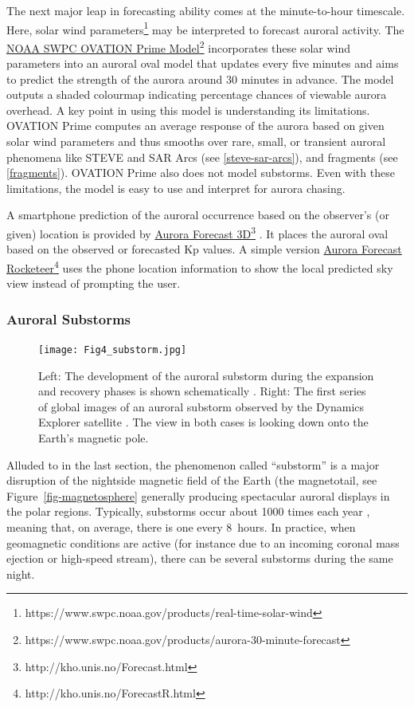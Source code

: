 \documentclass{article}
\renewcommand{\cite}[1]{\parencite{#1}}
\begin{document}
The next major leap in forecasting ability comes at the minute-to-hour timescale. Here, solar wind parameters\footnote{https://www.swpc.noaa.gov/products/real-time-solar-wind} may be interpreted to forecast auroral activity. The \href{https://www.swpc.noaa.gov/products/aurora-30-minute-forecast}{NOAA SWPC OVATION Prime Model}\footnote{https://www.swpc.noaa.gov/products/aurora-30-minute-forecast} \cite{Newell2014} incorporates these solar wind parameters into an auroral oval model that updates every five minutes and aims to predict the strength of the aurora around 30 minutes in advance. The model outputs a shaded colourmap indicating percentage chances of viewable aurora overhead. A key point in using this model is understanding its limitations. OVATION Prime computes an average response of the aurora based on given solar wind parameters and thus smooths over rare, small, or transient auroral phenomena like STEVE and SAR Arcs (see \ref{steve-sar-arcs}), and fragments (see \ref{fragments}). OVATION Prime also does not model substorms. Even with these limitations, the model is easy to use and interpret for aurora chasing.

A smartphone prediction of the auroral occurrence based on the observer's (or given) location is provided by \href{http://kho.unis.no/Forecast.html}{Aurora Forecast 3D}\footnote{http://kho.unis.no/Forecast.html} \cite{Sigernes2011}. It places the auroral oval based on the observed or forecasted Kp values. A simple version \href{http://kho.unis.no/ForecastR.html}{Aurora Forecast Rocketeer}\footnote{http://kho.unis.no/ForecastR.html} uses the phone location information to show the local predicted sky view instead of prompting the user.

\subsubsection{Auroral Substorms}
\label{auroral-substorms}

\begin{figure}
  \texttt{[image: Fig4\_substorm.jpg]}
  \caption{Left: The development of the auroral substorm during the expansion and recovery phases is shown schematically \cite{Akasofu1964}. Right: The first series of global images of an auroral substorm observed by the Dynamics Explorer satellite \cite{frank1988}. The view in both cases is looking down onto the Earth's magnetic pole.} 
  \label{fig-substorm}
\end{figure}

Alluded to in the last section, the phenomenon called ``substorm'' is a major disruption of the nightside magnetic field of the Earth (the magnetotail, see Figure~\ref{fig-magnetosphere} generally producing spectacular auroral displays in the polar regions. Typically, substorms occur about 1000 times each year \cite{Partamies2013}, meaning that, on average, there is one every 8~hours. In practice, when geomagnetic conditions are active (for instance due to an incoming coronal mass ejection or high-speed stream), there can be several substorms during the same night. 
\end{document}
